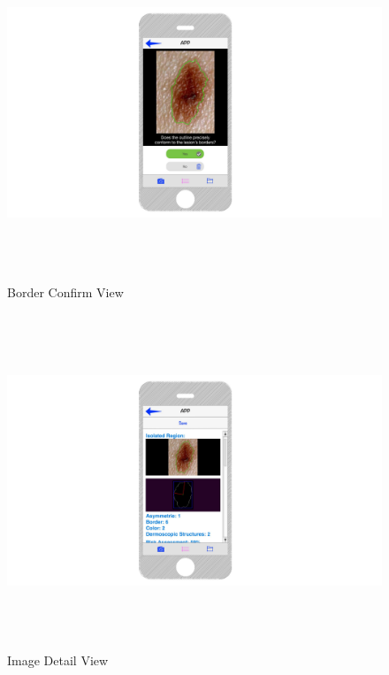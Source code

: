 \begin{figure}[H]
    \centering
    \includegraphics[height=10cm,keepaspectratio]{assets/GUI/border_confirm.pdf}
    \caption{Border Confirm View}
    \label{fig:border_confirm_view}
\end{figure}

\begin{figure}[H]
    \centering
    \includegraphics[height=10cm,keepaspectratio]{assets/GUI/image_detail_view.pdf}
    \caption{Image Detail View}
    \label{fig:image_detail_view}
\end{figure}

